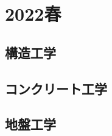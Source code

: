 \newpage
\section{2022春}
\setcounter{yearcounter}{2022}

\subsection{構造工学}
\subsection{コンクリート工学}
\subsection{地盤工学}
